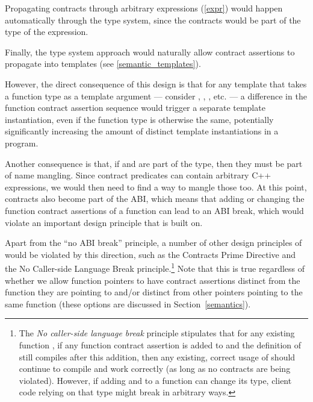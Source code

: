 Propagating contracts through arbitrary expressions (\ref{expr}) would happen automatically through the type system, since the contracts would be part of the type of the expression.

Finally, the type system approach would naturally allow contract assertions to propagate into templates (see \ref{semantic_templates}). 

However, the direct consequence of this design is that for any template that takes a function type as a template argument --- consider , , , etc. --- a difference in the function contract assertion sequence would trigger a separate template instantiation, even if the function type is otherwise the same, potentially significantly increasing the amount of distinct template instantiations in a program. 

Another consequence is that, if  and  are part of the type,  then they must be part of name mangling. Since contract predicates can contain arbitrary C++ expressions, we would then need to find a way to mangle those too. At this point, contracts also become part of the ABI, which means that adding or changing the function contract assertions of a function can lead to an ABI break, which would violate an important design principle that \cite{P2900R8} is built on.

Apart from the ``no ABI break'' principle, a number of other design principles of \cite{P2900R8} would be violated by this direction, such as the Contracts Prime Directive and the No Caller-side Language Break principle.\footnote{ The \emph{No caller-side language break} principle stipulates that for any existing function , if any function contract assertion is added to  and the definition of  still compiles after this addition, then any existing, correct usage of  should continue to compile and work correctly (as long as no contracts are being violated). However, if adding  and  to a function can change its type, client code relying on that type might break in arbitrary ways.} Note that this is true regardless of whether we allow function pointers to have contract assertions distinct from the function they are pointing to and/or distinct from other pointers pointing to the same function (these options are discussed in Section~\ref{semantics}).

